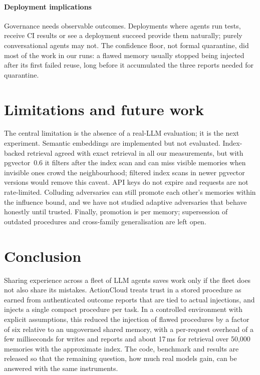 \documentclass[5p,times,twocolumn]{elsarticle}
\newcommand{\sysname}{ActionCloud}
\begin{document}
\paragraph{Deployment implications}
Governance needs observable outcomes. Deployments where agents run tests, receive CI results or see a deployment succeed provide them naturally; purely conversational agents may not. The confidence floor, not formal quarantine, did most of the work in our runs: a flawed memory usually stopped being injected after its first failed reuse, long before it accumulated the three reports needed for quarantine.

\section{Limitations and future work}
\label{sec:limitations}
The central limitation is the absence of a real-LLM evaluation; it is the next experiment. Semantic embeddings are implemented but not evaluated. Index-backed retrieval agreed with exact retrieval in all our measurements, but with pgvector~0.6 it filters after the index scan and can miss visible memories when invisible ones crowd the neighbourhood; filtered index scans in newer pgvector versions would remove this caveat. API keys do not expire and requests are not rate-limited. Colluding adversaries can still promote each other's memories within the influence bound, and we have not studied adaptive adversaries that behave honestly until trusted. Finally, promotion is per memory; supersession of outdated procedures and cross-family generalisation are left open.

\section{Conclusion}
\label{sec:conclusion}
Sharing experience across a fleet of LLM agents saves work only if the fleet does not also share its mistakes. \sysname{} treats trust in a stored procedure as earned from authenticated outcome reports that are tied to actual injections, and injects a single compact procedure per task. In a controlled environment with explicit assumptions, this reduced the injection of flawed procedures by a factor of six relative to an ungoverned shared memory, with a per-request overhead of a few milliseconds for writes and reports and about 17\,ms for retrieval over 50,000 memories with the approximate index. The code, benchmark and results are released so that the remaining question, how much real models gain, can be answered with the same instruments.
\end{document}
